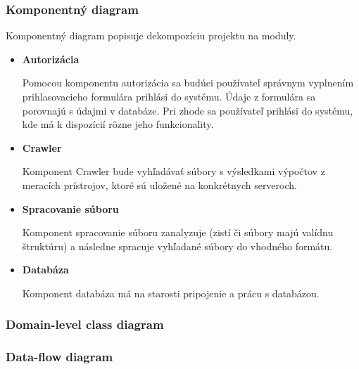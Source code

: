 \documentclass[12pt,a4paper]{article}
\begin{document}
\subsubsection{Komponentný diagram}
Komponentný diagram popisuje dekompozíciu projektu na moduly.
\begin{itemize}
	\item{\bf Autorizácia} \par
	Pomocou komponentu autorizácia sa budúci používateľ správnym vyplnením prihlasovacieho formulára prihlási do systému. Údaje z formulára sa porovnajú s údajmi v databáze. Pri zhode sa používateľ prihlási do systému, kde má k dispozícií rôzne jeho funkcionality.
	\item{\bf Crawler} \par
	Komponent Crawler bude vyhľadávať súbory s výsledkami výpočtov z meracích prístrojov, ktoré sú uložené na konkrétnych serveroch.
	\item{\bf Spracovanie súboru} \par
	Komponent spracovanie súboru zanalyzuje (zistí či súbory majú valídnu štruktúru) a následne spracuje vyhľadané súbory do vhodného formátu.
	\item{\bf Databáza} \par
	Komponent databáza má na starosti pripojenie a prácu s databázou.
\end{itemize}

\subsubsection{Domain-level class diagram}


\subsubsection{Data-flow diagram}
\end{document}
